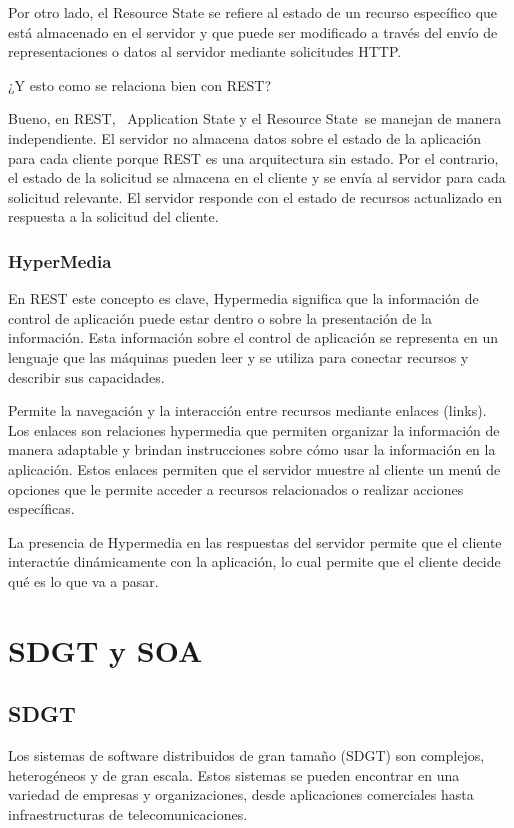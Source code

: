 \documentclass{article}
\begin{document}
		Por otro lado, el Resource State se refiere al estado de un recurso específico que está almacenado en el servidor y que puede ser modificado a través del envío de representaciones o datos al servidor mediante solicitudes HTTP.

		¿Y esto como se relaciona bien con REST? 
		
		Bueno, en REST,  Application State y el Resource State se manejan de manera independiente. El servidor no almacena datos sobre el estado de la aplicación para cada cliente porque REST es una arquitectura sin estado. Por el contrario, el estado de la solicitud se almacena en el cliente y se envía al servidor para cada solicitud relevante. El servidor responde con el estado de recursos actualizado en respuesta a la solicitud del cliente.
		
		\subsubsection{HyperMedia}\label{sec:hypermedia}
		
		En REST este concepto es clave, Hypermedia significa que la información de control de aplicación puede estar dentro o sobre la presentación de la información. Esta información sobre el control de aplicación se representa en un lenguaje que las máquinas pueden leer y se utiliza para conectar recursos y describir sus capacidades.
		
		Permite la navegación y la interacción entre recursos mediante enlaces (links). Los enlaces son relaciones hypermedia que permiten organizar la información de manera adaptable y brindan instrucciones sobre cómo usar la información en la aplicación. Estos enlaces permiten que el servidor muestre al cliente un menú de opciones que le permite acceder a recursos relacionados o realizar acciones específicas.
		
		La presencia de Hypermedia en las respuestas del servidor permite que el cliente interactúe dinámicamente con la aplicación, lo cual permite que el cliente decide qué es lo que va a pasar.
		
		
		
		\section{SDGT y SOA}
		
		\subsection{SDGT}
			Los sistemas de software distribuidos de gran tamaño (SDGT) son complejos, heterogéneos y de gran escala. Estos sistemas se pueden encontrar en una variedad de empresas y organizaciones, desde aplicaciones comerciales hasta infraestructuras de telecomunicaciones.
			
\end{document}
